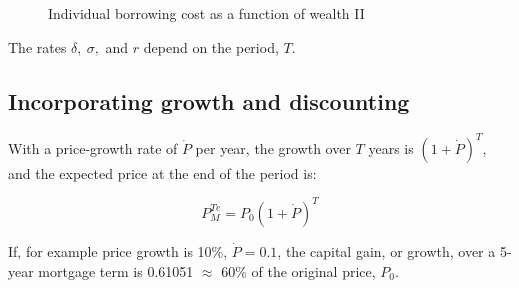 \begin{figure}
\caption{Individual borrowing cost as a function of wealth II}
\label{Fig:Borrowingrate2}
\end{figure}

The rates $\delta,\ \sigma,$ and $r$ depend on the period, $T$. 

\subsection{Incorporating growth and discounting}

With a price-growth rate of $\dot P$ per year, the growth over $T$ years is $(1+\dot P)^T$, and  %
the expected price at the end of the period is:

\[P_M^{Te}=P_0(1+\dot P)^T\]

If, for example price growth is 10\%, $\dot P= 0.1$, the {capital gain}, or growth, over a 5-year mortgage term is 0.61051 $\approx$ 60\% of the original price, $P_0$.

